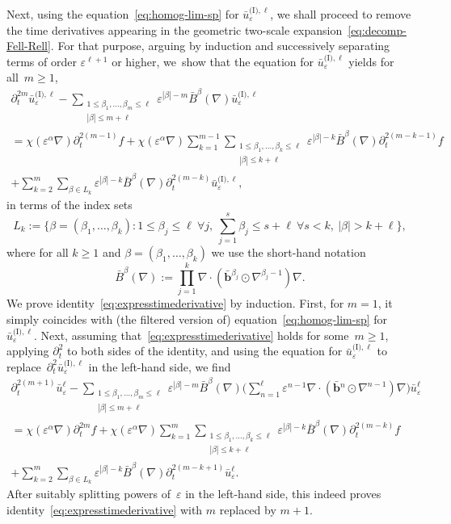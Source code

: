 \documentclass[10pt]{amsart}
\theoremstyle{plain}
\theoremstyle{definition}
\numberwithin{equation}{section}
\newcommand{\e}{\varepsilon}
\newcommand{\bb}{{\boldsymbol b}}
\begin{document}
Next, using the equation~\eqref{eq:homog-lim-sp} for $\bar{u}_{\e}^{\text{(I)},\ell}$, we shall proceed to remove the time derivatives appearing in the geometric two-scale expansion~\eqref{eq:decomp-Fell-Rell}.
For that purpose, argu\-ing by induction and successively {separating} terms of order $\e^{\ell+1}$ or higher, we~show that the equation for $\bar{u}_{\e}^{\text{(I)},\ell}$ yields for all~$m\ge1$,
\begin{multline}\label{eq:expresstimederivative}
\partial_t^{2m} \bar{u}^{\text{(I)},\ell}_{\e}-\sum_{\substack{1\le \beta_1,\ldots,\beta_m\le \ell\\|\beta|\le m+\ell}}\e^{|\beta|-m}\bar B^\beta(\nabla)\bar{u}^{\text{(I)},\ell}_{\e}\\
=\chi(\e^{\alpha}\nabla)\partial_t^{2(m-1)}f+\chi(\e^{\alpha}\nabla)\sum_{k=1}^{m-1}\sum_{\substack{1\le \beta_1,\ldots,\beta_k\le\ell\\|\beta|\le k+\ell}}\e^{|\beta|-k}\bar B^\beta(\nabla)\partial_t^{2(m-k-1)}f\\
+\sum_{k=2}^m\sum_{\beta\in L_k}\e^{|\beta|-k}\bar B^\beta(\nabla)\partial_t^{2(m-k)}\bar u^{\text{(I)},\ell}_\e,
\end{multline}
in terms of the index sets
\[L_k:=\Big\{\beta=(\beta_1,\dots,\beta_k):1\le\beta_j\le\ell~\forall j,~\sum_{j=1}^s\beta_j\le s+\ell~\forall s<k,~|\beta|>k+\ell\Big\},\]
where for all $k\ge1$ and $\beta=(\beta_1,\ldots,\beta_k)$ we use the short-hand notation
\begin{equation}\label{eq:not-bigBb}
\bar{B}^\beta(\nabla):=\prod_{j=1}^k\nabla\cdot(\bar\bb{}^{\beta_j}\odot\nabla^{\beta_j-1})\nabla.
\end{equation}
We prove identity~\eqref{eq:expresstimederivative} by induction.
First, for $m=1$, it simply coincides with (the filtered version of) equation~\eqref{eq:homog-lim-sp} for $\bar{u}_{\e}^{\text{(I)},\ell}$.
Next, assuming that~\eqref{eq:expresstimederivative} holds for some~$m\ge1$, applying $\partial_t^2$ to both sides of the identity, and using the equation for $\bar{u}_{\e}^{\text{(I)},\ell}$ to replace~$\partial_t^2\bar{u}_{\e}^{\text{(I)},\ell}$ in the left-hand side, we find
\begin{multline*}
\partial_t^{2(m+1)} \bar{u}^{\ell}_{\e}-\sum_{\substack{1\le \beta_1,\ldots,\beta_m\le \ell\\|\beta|\le m+\ell}}\e^{|\beta|-m}\bar B^\beta(\nabla)\Big(\sum_{n=1}^\ell\e^{n-1}\nabla\cdot(\bar\bb{}^n\odot\nabla^{n-1})\nabla\Big)\bar{u}^{\ell}_{\e}\\
=\chi(\e^{\alpha}\nabla)\partial_t^{2m}f+\chi(\e^{\alpha}\nabla)\sum_{k=1}^{m}\sum_{\substack{1\le \beta_1,\ldots,\beta_k\le\ell\\|\beta|\le k+\ell}}\e^{|\beta|-k}\bar B^\beta(\nabla)\partial_t^{2(m-k)}f\\
+\sum_{k=2}^m\sum_{\beta\in L_k}\e^{|\beta|-k}\bar B^\beta(\nabla)\partial_t^{2(m-k+1)}\bar u^\ell_\e.
\end{multline*}
After suitably splitting powers of~$\e$ in the left-hand side, this indeed proves identity~\eqref{eq:expresstimederivative} with $m$ replaced by $m+1$.
\end{document}
